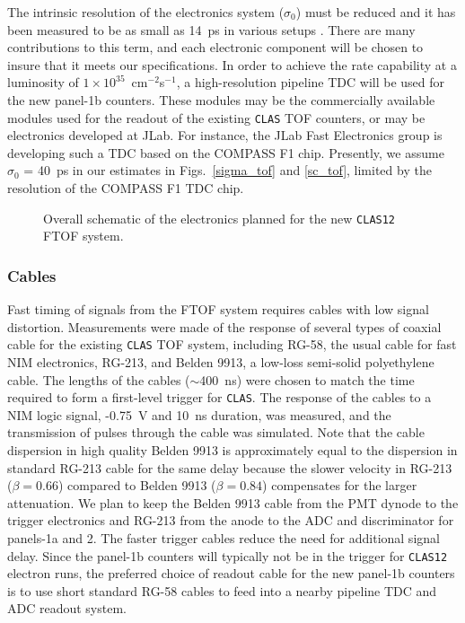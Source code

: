 The intrinsic resolution of the electronics system ($\sigma_0$) must be 
reduced and it has been measured to be as small as 14~ps in various setups
\cite{smith2}.  There are many contributions to this term, and each electronic 
component will be chosen to insure that it meets our specifications.  In 
order to achieve the rate capability at a luminosity of 
$1 \times 10^{35}$~cm$^{-2}$s$^{-1}$, a high-resolution pipeline TDC will be 
used for the new panel-1b counters.  These modules may be the commercially 
available modules used for the readout of the existing {\tt CLAS} TOF 
counters, or may be electronics developed at JLab.  For instance, the JLab 
Fast Electronics group is developing such a TDC based on the COMPASS F1 chip. 
Presently, we assume $\sigma_0$ = 40~ps in our estimates in 
Figs.~\ref{sigma_tof} and \ref{sc_tof}, limited by the resolution of the 
COMPASS F1 TDC chip. 

\begin{figure}[htbp]
\vspace{6.7cm}
\caption{\small{Overall schematic of the electronics planned for the new
{\tt CLAS12} FTOF system.}}
\label{electronics_new}
\end{figure}

\subsubsection{Cables}

Fast timing of signals from the FTOF system requires cables with low 
signal distortion.  Measurements were made of the response of several 
types of coaxial cable for the existing {\tt CLAS} TOF system, including 
RG-58, the usual cable for fast NIM electronics, RG-213, and Belden 9913, 
a low-loss semi-solid polyethylene cable.  The lengths of the cables 
($\sim$400~ns) were chosen to match the time required to form a first-level 
trigger for {\tt CLAS}.  The response of the cables to a NIM logic signal, 
-0.75~V and 10~ns duration, was measured, and the transmission of pulses 
through the cable was simulated.  Note that the cable dispersion in high 
quality Belden 9913 is approximately equal to the dispersion in standard 
RG-213 cable for the same delay because the slower velocity in RG-213 
($\beta = 0.66$) compared to Belden 9913 ($\beta= 0.84$) compensates for 
the larger attenuation.  We plan to keep the Belden 9913 cable from the PMT 
dynode to the trigger electronics and RG-213 from the anode to the ADC and 
discriminator for panels-1a and 2.  The faster trigger cables reduce the 
need for additional signal delay.  Since the panel-1b counters will
typically not be in the trigger for {\tt CLAS12} electron runs, the
preferred choice of readout cable for the new panel-1b counters is to
use short standard RG-58 cables to feed into a nearby pipeline TDC and
ADC readout system.

